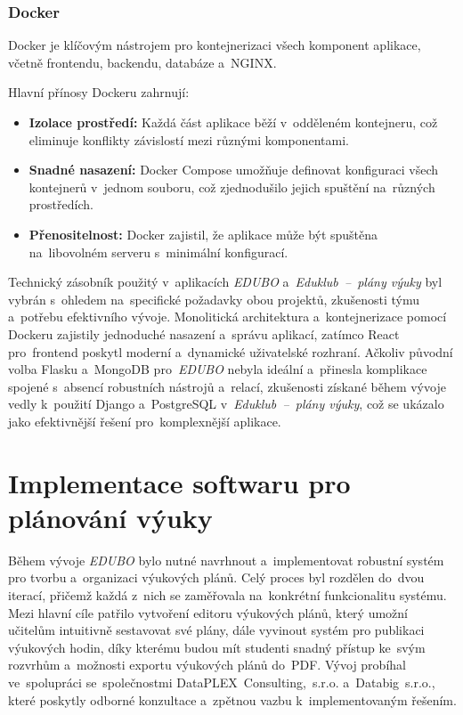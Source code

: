 \documentclass[male,czech,api_bc]{kitheses}
\begin{document}
\subsubsection{Docker}

Docker je klíčovým nástrojem pro kontejnerizaci všech komponent aplikace, včetně frontendu, backendu, databáze a~NGINX.

Hlavní přínosy Dockeru zahrnují:
\begin{itemize}
	\item \textbf{Izolace prostředí:} Každá část aplikace běží v~odděleném kontejneru, což eliminuje konflikty závislostí mezi různými komponentami.
	\item \textbf{Snadné nasazení:} Docker Compose umožňuje definovat konfiguraci všech kontejnerů v~jednom souboru, což zjednodušilo jejich spuštění na~různých prostředích.
	\item \textbf{Přenositelnost:} Docker zajistil, že aplikace může být spuštěna na~libovolném serveru s~minimální konfigurací.
\end{itemize}

Technický zásobník použitý v~aplikacích \textit{EDUBO} a~\textit{Eduklub~--~plány výuky} byl vybrán s~ohledem na~specifické požadavky obou projektů, zkušenosti týmu a~potřebu efektivního vývoje. Monolitická architektura a~kontejnerizace pomocí Dockeru zajistily jednoduché nasazení a~správu aplikací, zatímco React pro~frontend poskytl moderní a~dynamické uživatelské rozhraní. Ačkoliv původní volba Flasku a~MongoDB pro~\textit{EDUBO} nebyla ideální a~přinesla komplikace spojené s~absencí robustních nástrojů a~relací, zkušenosti získané během vývoje vedly k~použití Django a~PostgreSQL v~\textit{Eduklub~--~plány výuky}, což se ukázalo jako efektivnější řešení pro~komplexnější aplikace.


\section{Implementace softwaru pro plánování výuky}

Během vývoje \textit{EDUBO} bylo nutné navrhnout a~implementovat robustní systém pro tvorbu a~organizaci výukových plánů. Celý proces byl rozdělen do~dvou iterací, přičemž každá z~nich se zaměřovala na~konkrétní funkcionalitu systému. Mezi hlavní cíle patřilo vytvoření editoru výukových plánů, který umožní učitelům intuitivně sestavovat své plány, dále vyvinout systém pro publikaci výukových hodin, díky kterému budou mít studenti snadný přístup ke~svým rozvrhům a~možnosti exportu výukových plánů do~PDF. Vývoj probíhal ve~spolupráci se~společnostmi DataPLEX~Consulting,~s.r.o. a~Databig~s.r.o., které poskytly odborné konzultace a~zpětnou vazbu k~implementovaným řešením.
\end{document}

